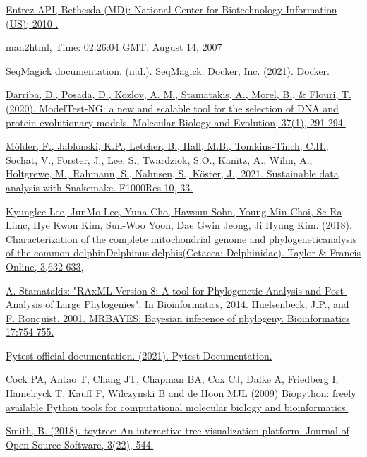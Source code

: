 \documentclass[12pt]{article}
\begin{document}
\newpage
\begin{thebibliography}{}

\href{https://www.ncbi.nlm.nih.gov/books/NBK25501/}{Entrez API, Bethesda (MD): National Center for Biotechnology Information (US); 2010-.}

\href{https://mafft.cbrc.jp/alignment/software/}{man2html, Time: 02:26:04 GMT, August 14, 2007}

\href{https://seqmagick.readthedocs.io/en/0.4.0/}{SeqMagick documentation. (n.d.). SeqMagick. }
\href{https://docs.docker.com}{Docker, Inc. (2021). Docker. }

\href{https://github.com/ddarriba/modeltest}{Darriba, D., Posada, D., Kozlov, A. M., Stamatakis, A., Morel, B., \& Flouri, T. (2020). ModelTest-NG: a new and scalable tool for the selection of DNA and protein evolutionary models. Molecular Biology and Evolution, 37(1), 291-294.}
 
\href{https://f1000research.com/articles/10-33/v1}{Mölder, F., Jablonski, K.P., Letcher, B., Hall, M.B., Tomkins-Tinch, C.H., Sochat, V., Forster, J., Lee, S., Twardziok, S.O., Kanitz, A., Wilm, A., Holtgrewe, M., Rahmann, S., Nahnsen, S., Köster, J., 2021. Sustainable data analysis with Snakemake. F1000Res 10, 33.}

\href{https://www.tandfonline.com/doi/epdf/10.1080/23802359.2018.1473720?needAccess=true&role=button}{Kyunglee Lee, JunMo Lee, Yuna Cho, Hawsun Sohn, Young-Min Choi, Se Ra Limc, Hye Kwon Kim, Sun-Woo Yoon, Dae Gwin Jeong, Ji Hyung Kim. (2018). Characterization of the complete mitochondrial genome and phylogeneticanalysis of the common dolphinDelphinus delphis(Cetacea: Delphinidae).  Taylor \& Francis Online, 3,632-633,}

\href{https://cme.h-its.org/exelixis/resource/download/NewManual.pdf}{A. Stamatakis: "RAxML Version 8: A tool for Phylogenetic Analysis and Post-Analysis of Large
Phylogenies". In Bioinformatics, 2014.
}
\href{https://nbisweden.github.io/MrBayes/manual.html}{Huelsenbeck, J.P., and F. Ronquist. 2001. MRBAYES: Bayesian inference of phylogeny. Bioinformatics 17:754-755.}

\href{https://docs.pytest.org/en/7.2.x/}{Pytest official documentation. (2021). Pytest Documentation.}

\href{https://biopython.org/wiki/Documentation}{Cock PA, Antao T, Chang JT, Chapman BA, Cox CJ, Dalke A, Friedberg I, Hamelryck T, Kauff F, Wilczynski B and de Hoon MJL (2009) Biopython: freely available Python tools for computational molecular biology and bioinformatics.}

\href{https://toytree.readthedocs.io/en/latest/}{Smith, B. (2018). toytree: An interactive tree visualization platform. Journal of Open Source Software, 3(22), 544.}
\end{thebibliography}
\newpage
\appendix
\end{document}
